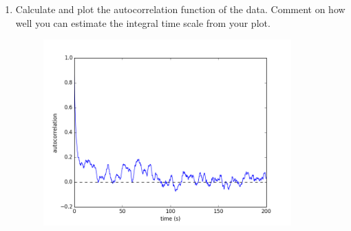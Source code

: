 \documentclass[11pt]{article}
\begin{document}
\begin{enumerate}[label=(\alph*),topsep=-10pt]
	\item Calculate and plot the autocorrelation function of the data. Comment on how well you can estimate the integral time scale from your plot.
	\begin{figure}[H]
	\centering
	\includegraphics[width=0.9\textwidth]{autocorrelation}
	\end{figure}
\end{enumerate}


\end{document}
